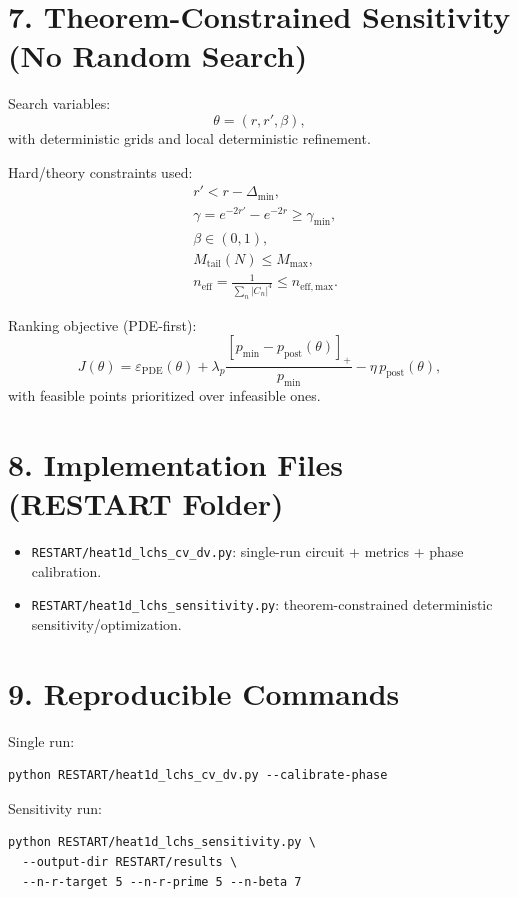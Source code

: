 \documentclass[11pt]{article}
\begin{document}
\section*{7. Theorem-Constrained Sensitivity (No Random Search)}
Search variables:
\begin{equation}
\theta=(r,r',\beta),
\end{equation}
with deterministic grids and local deterministic refinement.

Hard/theory constraints used:
\begin{align}
&r'<r-\Delta_{\min},\\
&\gamma=e^{-2r'}-e^{-2r}\ge \gamma_{\min},\\
&\beta\in(0,1),\\
&M_{\mathrm{tail}}(N)\le M_{\max},\\
&n_{\mathrm{eff}}=\frac{1}{\sum_n|C_n|^4}\le n_{\mathrm{eff,max}}.
\end{align}

Ranking objective (PDE-first):
\begin{equation}
J(\theta)=\varepsilon_{\mathrm{PDE}}(\theta)
+\lambda_p\frac{[p_{\min}-p_{\mathrm{post}}(\theta)]_+}{p_{\min}}
-\eta\,p_{\mathrm{post}}(\theta),
\end{equation}
with feasible points prioritized over infeasible ones.

\section*{8. Implementation Files (RESTART Folder)}
\begin{itemize}
\item \texttt{RESTART/heat1d\_lchs\_cv\_dv.py}: single-run circuit + metrics + phase calibration.
\item \texttt{RESTART/heat1d\_lchs\_sensitivity.py}: theorem-constrained deterministic sensitivity/optimization.
\end{itemize}

\section*{9. Reproducible Commands}
Single run:
\begin{verbatim}
python RESTART/heat1d_lchs_cv_dv.py --calibrate-phase
\end{verbatim}

Sensitivity run:
\begin{verbatim}
python RESTART/heat1d_lchs_sensitivity.py \
  --output-dir RESTART/results \
  --n-r-target 5 --n-r-prime 5 --n-beta 7
\end{verbatim}
\end{document}
